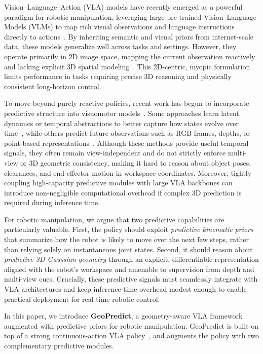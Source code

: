 Vision--Language--Action (VLA) models have recently emerged as a powerful paradigm for robotic manipulation, leveraging large pre-trained Vision--Language Models (VLMs) to map rich visual observations and language instructions directly to actions~\cite{brohan2022rt, zitkovich2023rt, li2024cogact, zheng2025universal}. By inheriting semantic and visual priors from internet-scale data, these models generalize well across tasks and settings. However, they operate primarily in 2D image space, mapping the current observation reactively and lacking explicit 3D spatial modeling~\cite{zhong2025survey}. This 2D-centric, myopic formulation limits performance in tasks requiring precise 3D reasoning and physically consistent long-horizon control.

To move beyond purely reactive policies, recent work has begun to incorporate predictive structure into visuomotor models~\cite{hu2025video, li2025unified, lu2025gwm}. Some approaches learn latent dynamics or temporal abstractions to better capture how states evolve over time~\cite{chen2025villa, chen2025moto, li2024vision, zhao2025cot}, while others predict future observations such as RGB frames, depths, or point-based representations~\cite{cen2025worldvla,zhangdreamvla,hu2025video,qian2025wristworld, grauman2022ego4d,gupta2024pre}. Although these methods provide useful temporal signals, they often remain view-independent and do not strictly enforce multi-view or 3D geometric consistency, making it hard to reason about object poses, clearances, and end-effector motion in workspace coordinates. Moreover, tightly coupling high-capacity predictive modules with large VLA backbones can introduce non-negligible computational overhead if complex 3D prediction is required during inference time.

For robotic manipulation, we argue that two predictive capabilities are particularly valuable. First, the policy should exploit \emph{predictive kinematic priors} that summarize how the robot is likely to move over the next few steps, rather than relying solely on instantaneous joint states. Second, it should reason about \emph{predictive 3D Gaussian geometry} through an explicit, differentiable representation aligned with the robot’s workspace and amenable to supervision from depth and multi-view cues. Crucially, these predictive signals must seamlessly integrate with VLA architectures and keep inference-time overhead modest enough to enable practical deployment for real-time robotic control.

In this paper, we introduce \textbf{GeoPredict}, a geometry-aware VLA framework augmented with predictive priors for robotic manipulation. GeoPredict is built on top of a strong continuous-action VLA policy~\cite{black2410pi0}, and augments the policy with two complementary predictive modules.


